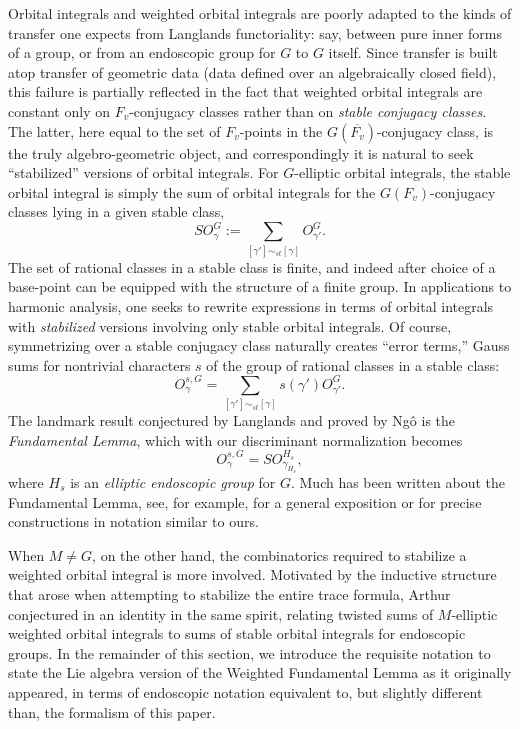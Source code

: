 \documentclass[openany]{amsbook}
\theoremstyle{definition}
\theoremstyle{remark}
\numberwithin{equation}{section}
\newcommand{\ol}[1]{\overline{#1}}
\renewcommand{\-}{\operatorname{-}}
\begin{document}
Orbital integrals and weighted orbital integrals are poorly adapted to the kinds of transfer one expects from Langlands functoriality: say, between pure inner forms of a group, or from an endoscopic group for $G$ to $G$ itself. Since transfer is built atop transfer of geometric data (data defined over an algebraically closed field), this failure is partially reflected in the fact that weighted orbital integrals are constant only on $F_v$-conjugacy classes rather than on \emph{stable conjugacy classes}. The latter, here equal to the set of $F_v$-points in the $G(\ol{F_v})$-conjugacy class, is the truly algebro-geometric object, and correspondingly it is natural to seek ``stabilized'' versions of orbital integrals. For $G$-elliptic orbital integrals, the stable orbital integral is simply the sum of orbital integrals for the $G(F_v)$-conjugacy classes lying in a given stable class,
$$
    SO_{\gamma}^G := \sum_{[\gamma'] \sim_{st} [\gamma]} O_{\gamma'}^G.
$$
The set of rational classes in a stable class is finite, and indeed after choice of a base-point can be equipped with the structure of a finite group. In applications to harmonic analysis, one seeks to rewrite expressions in terms of orbital integrals with \textit{stabilized} versions involving only stable orbital integrals. Of course, symmetrizing over a stable conjugacy class naturally creates ``error terms,'' Gauss sums for nontrivial characters $s$ of the group of rational classes in a stable class:
$$
    O_{\gamma}^{s, G} = \sum_{[\gamma'] \sim_{st} [\gamma]} s(\gamma') O_{\gamma'}^G.
$$
The landmark result conjectured by Langlands and proved by Ng\^{o} is the \textit{Fundamental Lemma}, which with our discriminant normalization becomes \cite[\S 1.11.3]{ngofl}
$$
    O_{\gamma}^{s, G} =  SO_{\gamma_{H_s}}^{H_s},
$$
where $H_s$ is an \textit{elliptic endoscopic group} for $G$. Much has been written about the Fundamental Lemma, see, for example, \cite{halesfl} for a general exposition or \cite[\S 1.11]{ngofl} for precise constructions in notation similar to ours.

When $M \neq G$, on the other hand, the combinatorics required to stabilize a weighted orbital integral is more involved. Motivated by the inductive structure that arose when attempting to stabilize the entire trace formula, Arthur conjectured in \cite{ArthurStableI} an identity in the same spirit, relating twisted sums of $M$-elliptic weighted orbital integrals to sums of stable orbital integrals for endoscopic groups. In the remainder of this section, we introduce the requisite notation to state the Lie algebra version of the Weighted Fundamental Lemma as it originally appeared, in terms of endoscopic notation equivalent to, but slightly different than, the formalism of this paper.
\end{document}
